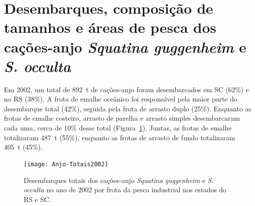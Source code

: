 \documentclass[a4paper,11pt,twoside,showtrims,onecolumn,openright,final]{memoir}
\begin{document}

\section*{Desembarques, composição de tamanhos e áreas de pesca 
         dos cações-anjo \emph{Squatina guggenheim} e \emph{S. occulta}}


Em 2002, um total de 892~t de cações-anjo foram desembarcados em SC (62\%) e no RS (38\%). 
A frota de emalhe oceânico foi responsável pela maior parte do desembarque total (42\%), seguida 
pela frota de arrasto duplo (25\%). Enquanto as frotas de emalhe costeiro, arrasto de parelha 
e arrasto simples desembarcaram cada uma, cerca de 10\% desse total (Figura~\ref{fig:desemb-anjo}). 
Juntas, as frotas de emalhe totalizaram 487~t (55\%), enquanto as frotas de arrasto de fundo 
totalizaram 405~t (45\%). 

%
%

\begin{figure}
\begin{center}
\texttt{[image: Anjo-Totais2002]}
\end{center}
\caption[Desembarques totais de cações-anjo no ano de 2002 por frota da pesca industrial.]
        {Desembarques totais dos cações-anjo \emph{Squatina guggenheim} e \emph{S. occulta}
         no ano de 2002 por frota da pesca industrial nos estados do RS e SC.}
\label{fig:desemb-anjo}
\end{figure}

\end{document}
